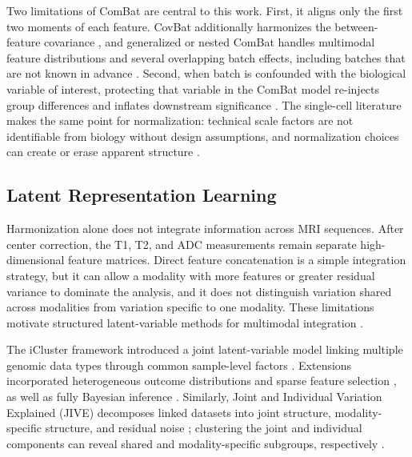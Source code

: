 \documentclass[conference]{IEEEtran}
\begin{document}
Two limitations of ComBat are central to this work. First, it aligns only the first two moments of each feature. CovBat additionally harmonizes the between-feature covariance \cite{chen2022covbat}, and generalized or nested ComBat handles multimodal feature distributions and several overlapping batch effects, including batches that are not known in advance \cite{horng2022generalized}. Second, when batch is confounded with the biological variable of interest, protecting that variable in the ComBat model re-injects group differences and inflates downstream significance \cite{nygaard2016methods}. The single-cell literature makes the same point for normalization: technical scale factors are not identifiable from biology without design assumptions, and normalization choices can create or erase apparent structure \cite{vallejos2017normalizing}.

\subsection{Latent Representation Learning}

Harmonization alone does not integrate information across MRI sequences. After center correction, the T1, T2, and ADC measurements remain separate high-dimensional feature matrices. Direct feature concatenation is a simple integration strategy, but it can allow a modality with more features or greater residual variance to dominate the analysis, and it does not distinguish variation shared across modalities from variation specific to one modality. These limitations motivate structured latent-variable methods for multimodal integration \cite{li2026integrative}.

The iCluster framework introduced a joint latent-variable model linking multiple genomic data types through common sample-level factors \cite{shen2009icluster}. Extensions incorporated heterogeneous outcome distributions and sparse feature selection \cite{mo2013pattern}, as well as fully Bayesian inference \cite{mo2018bayesian}. Similarly, Joint and Individual Variation Explained (JIVE) decomposes linked datasets into joint structure, modality-specific structure, and residual noise \cite{lock2013jive}; clustering the joint and individual components can reveal shared and modality-specific subgroups, respectively \cite{hellton2016integrative}.
\end{document}
